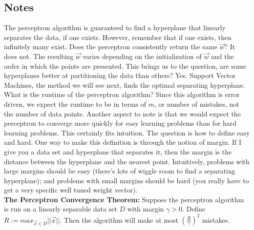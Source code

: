 \documentclass[10pt]{article}
\begin{document}
	\subsection*{Notes}
		The perceptron algorithm is guaranteed to find a hyperplane that linearly separates the data, if one exists. 
		However, remember that if one exists, then infinitely many exist. Does the perceptron consistently return 
		the same $\vec w$? It does not. The resulting $\vec w$ varies depending on the initialization of $\vec w$ 
		and the order in which the points are presented. This brings us to the question, are some hyperplanes better 
		at partitioning the data than others? Yes. Support Vector Machines, the method we will see next, finds the 
		optimal separating hyperplane. \\
		
		\noindent What is the runtime of the perceptron algorithm? Since this algorithm is error driven, we expect the 
		runtime to be in terms of $m$, or number of mistakes, not the number of data points. Another aspect to note is 
		that we would expect the perceptron to converge more quickly for easy learning problems than for hard learning 
		problems. This certainly fits intuition. The question is how to define easy and hard. One way to make this 
		definition is through the notion of margin. If I give you a data set and hyperplane that separates it, then the 
		margin is the distance between the hyperplane and the nearest point. Intuitively, problems with large margins 
		should be easy (there's lots of wiggle room to find a separating hyperplane); and problems with small margins 
		should be hard (you really have to get a very specific well tuned weight vector). \\
		
		\noindent \textbf{The Perceptron Convergence Theorem:} Suppose the perceptron algorithm is run on a 
		linearly separable data set $D$ with margin $\gamma > 0$. Define \break $R := max_{\vec x \in D} ||\vec x||$. Then 
		the algorithm will make at most $(\frac{R}{\gamma})^2$ mistakes.
		
\end{document}
